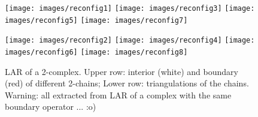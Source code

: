 \documentclass[11pt,oneside]{article}    %
\begin{document}
\begin{figure}[htbp] %
   \centering
   \texttt{[image: images/reconfig1]} 
   \texttt{[image: images/reconfig3]} 
   \texttt{[image: images/reconfig5]} 
   \texttt{[image: images/reconfig7]}
   
   \texttt{[image: images/reconfig2]} 
   \texttt{[image: images/reconfig4]} 
   \texttt{[image: images/reconfig6]} 
   \texttt{[image: images/reconfig8]}
    
   \caption{LAR of a 2-complex. Upper row: interior (white) and boundary (red) of different 2-chains; Lower row: triangulations of the chains. Warning: all extracted from LAR of a complex with the same boundary operator ... :o)}
   \label{fig:squareholes}
\end{figure}
\end{document}
